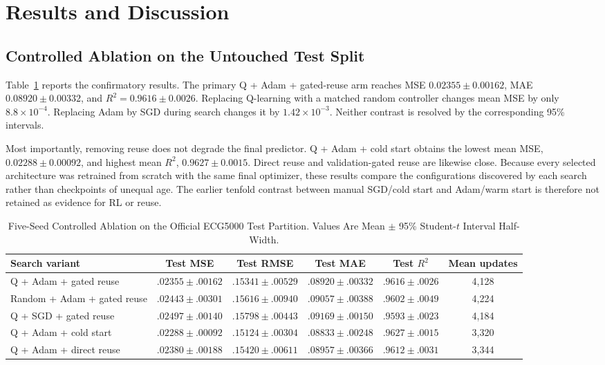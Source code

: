 \documentclass[conference]{IEEEtran}
\begin{document}
\section{Results and Discussion}
\subsection{Controlled Ablation on the Untouched Test Split}
Table~\ref{tab:controlled} reports the confirmatory results. The primary Q + Adam + gated-reuse arm reaches MSE $0.02355\pm0.00162$, MAE $0.08920\pm0.00332$, and $R^2=0.9616\pm0.0026$. Replacing Q-learning with a matched random controller changes mean MSE by only $8.8\times10^{-4}$. Replacing Adam by SGD during search changes it by $1.42\times10^{-3}$. Neither contrast is resolved by the corresponding 95\% intervals.

Most importantly, removing reuse does not degrade the final predictor. Q + Adam + cold start obtains the lowest mean MSE, $0.02288\pm0.00092$, and highest mean $R^2$, $0.9627\pm0.0015$. Direct reuse and validation-gated reuse are likewise close. Because every selected architecture was retrained from scratch with the same final optimizer, these results compare the configurations discovered by each search rather than checkpoints of unequal age. The earlier tenfold contrast between manual SGD/cold start and Adam/warm start is therefore not retained as evidence for RL or reuse.

\begin{table}[t]
\caption{Five-Seed Controlled Ablation on the Official ECG5000 Test Partition. Values Are Mean $\pm$ 95\% Student-$t$ Interval Half-Width.}
\label{tab:controlled}
\centering
\footnotesize
\setlength{\tabcolsep}{4pt}
\begin{tabular}{@{}lccccc@{}}
\toprule
Search variant & Test MSE & Test RMSE & Test MAE & Test $R^2$ & Mean updates \\
\midrule
Q + Adam + gated reuse & $.02355\pm.00162$ & $.15341\pm.00529$ & $.08920\pm.00332$ & $.9616\pm.0026$ & 4,128 \\
Random + Adam + gated reuse & $.02443\pm.00301$ & $.15616\pm.00940$ & $.09057\pm.00388$ & $.9602\pm.0049$ & 4,224 \\
Q + SGD + gated reuse & $.02497\pm.00140$ & $.15798\pm.00443$ & $.09169\pm.00150$ & $.9593\pm.0023$ & 4,184 \\
Q + Adam + cold start & $\mathbf{.02288\pm.00092}$ & $\mathbf{.15124\pm.00304}$ & $\mathbf{.08833\pm.00248}$ & $\mathbf{.9627\pm.0015}$ & 3,320 \\
Q + Adam + direct reuse & $.02380\pm.00188$ & $.15420\pm.00611$ & $.08957\pm.00366$ & $.9612\pm.0031$ & 3,344 \\
\bottomrule
\end{tabular}
\end{table}
\end{document}
